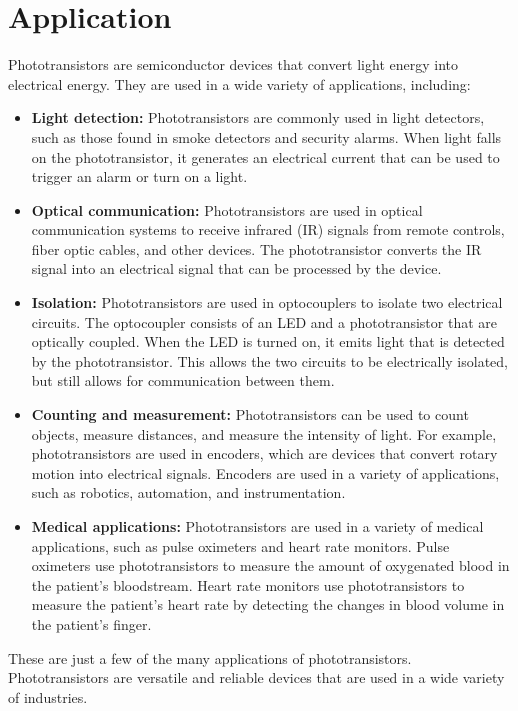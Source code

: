 \section{Application}
Phototransistors are semiconductor devices that convert light energy into electrical energy.
They are used in a wide variety of applications, including:
\begin{itemize}
    \item \textbf{Light detection:} Phototransistors are commonly used in light detectors, such as those found in smoke detectors and security alarms.
    When light falls on the phototransistor, it generates an electrical current that can be used to trigger an alarm or turn on a light.
    \item \textbf{Optical communication:} Phototransistors are used in optical communication systems to receive infrared (IR) signals from remote controls, fiber optic cables, and other devices.
    The phototransistor converts the IR signal into an electrical signal that can be processed by the device.
    \item \textbf{Isolation:} Phototransistors are used in optocouplers to isolate two electrical circuits.
    The optocoupler consists of an LED and a phototransistor that are optically coupled.
    When the LED is turned on, it emits light that is detected by the phototransistor.
    This allows the two circuits to be electrically isolated, but still allows for communication between them.
    \item \textbf{Counting and measurement:} Phototransistors can be used to count objects, measure distances, and measure the intensity of light.
    For example, phototransistors are used in encoders, which are devices that convert rotary motion into electrical signals.
    Encoders are used in a variety of applications, such as robotics, automation, and instrumentation.
    \item \textbf{Medical applications:} Phototransistors are used in a variety of medical applications, such as pulse oximeters and heart rate monitors.
    Pulse oximeters use phototransistors to measure the amount of oxygenated blood in the patient's bloodstream.
    Heart rate monitors use phototransistors to measure the patient's heart rate by detecting the changes in blood volume in the patient's finger.
\end{itemize}

\noindent These are just a few of the many applications of phototransistors. Phototransistors are versatile and reliable devices that are used in a wide variety of industries.